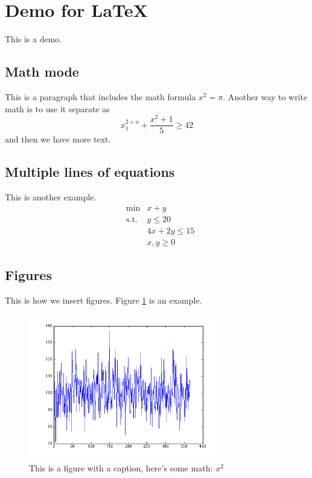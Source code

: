 \section{Demo for LaTeX}

This is a demo.

\subsection{Math mode}

This is a paragraph that includes the math formula $x^2 = \pi$.  Another way to write math is to use it separate as
$$
x_1^{2+a} + \frac{x^2+1}{5} \geq 42
$$
and then we have more text.

\subsection{Multiple lines of equations}

This is another example.
\begin{eqnarray*}
& \min & x + y \\
& \mbox{s.t.} & y \leq 20 \\
& & 4x + 2y \leq 15 \\
& & x,y \geq 0
\end{eqnarray*}

\subsection{Figures}
This is how we insert figures.  Figure \ref{fig:figure1} is an example.

\begin{figure}[htb]
\begin{center}

\includegraphics[width=0.75\textwidth]{fig1}
\caption{This is a figure with a caption, here's some math: $x^2$}
\label{fig:figure1}
\end{center}
\end{figure}

